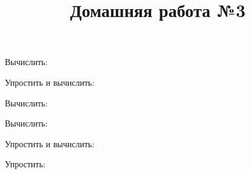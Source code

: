 \begin{listofex}
	\item Вычислить:
	\begin{enumcols}[itemcolumns=2]
		\item {}
		\item {}
		\item {}
		\item {}
		\item {}
		\item {}
	\end{enumcols}
	\item {}
	\item Упростить и вычислить:
	\begin{enumcols}[itemcolumns=2]
		\item {}
		\item {}
	\end{enumcols}
	\item {}
	\item {}
	\item {}
\end{listofex}
\newpage
\title{Домашняя работа №3}
\begin{listofex}
	\item Вычислить:
	\begin{enumcols}[itemcolumns=2]
		\item {}
		\item {}
		\item {}
		\item {}
	\end{enumcols}
	\item Вычислить:
	\begin{enumcols}[itemcolumns=2]
		\item {}
		\item {}
	\end{enumcols}
	\item Упростить и вычислить:
	\begin{enumcols}[itemcolumns=2]
		\item {}
		\item {}
		\item {}
	\end{enumcols}
	\item Упростить:
	\begin{enumcols}[itemcolumns=2]
		\item {}
		\item {}
	\end{enumcols}
	\item {}
	\item {}
\end{listofex}
